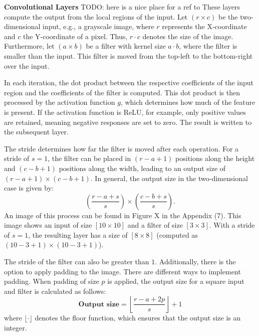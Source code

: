 \vspace{1em}

\textbf{Convolutional Layers}\label{theoretical_classification_conv_layers}
TODO: here is a nice place for a ref to \cite{Dumoulin2016TransposedConv}
These layers compute the output from the local regions of the input. Let $(r \times c)$ be the two-dimensional input, e.g., a grayscale image, where $r$ represents the X-coordinate and $c$ the Y-coordinate of a pixel. Thus, $r \cdot c$ denotes the size of the image. Furthermore, let $(a \times b)$ be a filter with kernel size $a \cdot b$, where the filter is smaller than the input. This filter is moved from the top-left to the bottom-right over the input.

In each iteration, the dot product between the respective coefficients of the input region and the coefficients of the filter is computed. This dot product is then processed by the activation function $g$, which determines how much of the feature is present. If the activation function is ReLU, for example, only positive values are retained, meaning negative responses are set to zero. The result is written to the subsequent layer.

The stride determines how far the filter is moved after each operation. For a stride of $s = 1$, the filter can be placed in $(r - a + 1)$ positions along the height and $(c - b + 1)$ positions along the width, leading to an output size of $(r - a + 1) \times (c - b + 1)$. In general, the output size in the two-dimensional case is given by:
\[
\left( \frac{r - a + s}{s} \right) \times \left( \frac{c - b + s}{s} \right).
\]
An image of this process can be found in Figure X in the Appendix (7). This image shows an input of size $[10 \times 10]$ and a filter of size $[3 \times 3]$. With a stride of $s = 1$, the resulting layer has a size of $[8 \times 8]$ (computed as $\left(10 - 3 + 1\right) \times \left(10 - 3 + 1\right)$).

The stride of the filter can also be greater than $1$. Additionally, there is the option to apply padding to the image. There are different ways to implement padding. When padding of size $p$ is applied, the output size for a square input and filter is calculated as follows:
\[
\textbf{Output size} = \left\lfloor \frac{r - a + 2p}{s} \right\rfloor + 1
\]
where $\lfloor \cdot \rfloor$ denotes the floor function, which ensures that the output size is an integer.

\vspace{1em}

